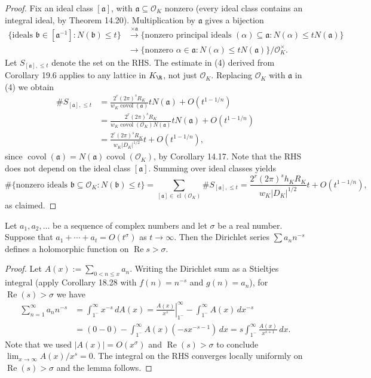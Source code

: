 \begin{proof}
Fix an ideal class $[\mathfrak a]$, with $\mathfrak a\subseteq\mathcal O_K$ nonzero (every ideal class contains an integral ideal, by Theorem 14.20). Multiplication by $\mathfrak a$ gives a bijection
\begin{align*}
\{\text{ideals }\mathfrak b\in[\mathfrak a^{-1}]:N(\mathfrak b)\leq t\}
&\xrightarrow{\times\mathfrak a}\{\text{nonzero principal ideals }(\alpha)\subseteq\mathfrak a:N(\alpha)\leq tN(\mathfrak a)\}\\
&\longrightarrow\{\text{nonzero }\alpha\in\mathfrak a:N(\alpha)\leq tN(\mathfrak a)\}/\mathcal O_K^\times.
\end{align*}
Let $S_{[\mathfrak a],\leq t}$ denote the set on the RHS. The estimate in (4) derived from Corollary 19.6 applies to any lattice in $K_\R$, not just $\mathcal O_K$. Replacing $\mathcal O_K$ with $\mathfrak a$ in (4) we obtain
\begin{align*}
\#S_{[\mathfrak a],\leq t}
&=\frac{2^r(2\pi)^sR_K}{w_K\operatorname{covol}(\mathfrak a)}tN(\mathfrak a)+O(t^{1-1/n})\\
&=\frac{2^r(2\pi)^sR_K}{w_K\operatorname{covol}(\mathcal O_K)N(\mathfrak a)}tN(\mathfrak a)+O(t^{1-1/n})\\
&=\frac{2^r(2\pi)^sR_K}{w_K|D_K|^{1/2}}t+O(t^{1-1/n}),
\end{align*}
since $\operatorname{covol}(\mathfrak a)=N(\mathfrak a)\operatorname{covol}(\mathcal O_K)$, by Corollary 14.17. Note that the RHS does not depend on the ideal class $[\mathfrak a]$. Summing over ideal classes yields
\[
\#\{\text{nonzero ideals }\mathfrak b\subseteq\mathcal O_K:N(\mathfrak b)\leq t\}
=\sum_{[\mathfrak a]\in\operatorname{cl}(\mathcal O_K)}\#S_{[\mathfrak a],\leq t}
=\frac{2^r(2\pi)^sh_KR_K}{w_K|D_K|^{1/2}}t+O(t^{1-1/n}),
\]
as claimed.
\end{proof}
\begin{lemma}[19.9]
Let $a_1,a_2,\ldots$ be a sequence of complex numbers and let $\sigma$ be a real number. Suppose that $a_1+\cdots+a_t=O(t^\sigma)$ as $t\to\infty$. Then the Dirichlet series $\sum a_nn^{-s}$ defines a holomorphic function on $\operatorname{Re}s>\sigma$.
\end{lemma}
\begin{proof}
Let $A(x):=\sum_{0<n\leq x}a_n$. Writing the Dirichlet sum as a Stieltjes integral (apply Corollary 18.28 with $f(n)=n^{-s}$ and $g(n)=a_n$), for $\operatorname{Re}(s)>\sigma$ we have
\begin{align*}
\sum_{n=1}^\infty a_nn^{-s}
&=\int_{1^-}^\infty x^{-s}\,dA(x)
=\left.\frac{A(x)}{x^s}\right|_{1^-}^\infty-\int_{1^-}^\infty A(x)\,dx^{-s}\\
&=(0-0)-\int_{1^-}^\infty A(x)(-sx^{-s-1})\,dx
=s\int_{1^-}^\infty\frac{A(x)}{x^{s+1}}\,dx.
\end{align*}
Note that we used $|A(x)|=O(x^\sigma)$ and $\operatorname{Re}(s)>\sigma$ to conclude $\lim_{x\to\infty}A(x)/x^s=0$. The integral on the RHS converges locally uniformly on $\operatorname{Re}(s)>\sigma$ and the lemma follows.
\end{proof}
